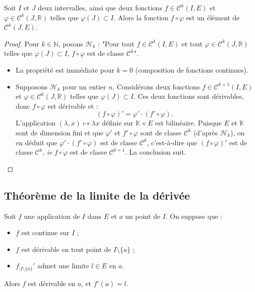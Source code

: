 \documentclass[french]{article}
\newcommand{\N}{\mathbb{N}}
\newcommand{\R}{\mathbb{R}}
\newcommand{\K}{\mathbb{K}}
\theoremstyle{plain}
\theoremstyle{definition}
\theoremstyle{remark}
\begin{document}
\begin{prop}%
	Soit $I$ et $J$ deux intervalles, ainsi que deux fonctions $f\in\mathcal{C}^k(I,E)$ et $\varphi\in\mathcal{C}^k(J,\R)$ telles que $\varphi(J)\subset I$. Alors la fonction $f\circ\varphi$ est un élément de $\mathcal{C}^k(J,E)$.
\end{prop}
\begin{proof}
	Pour $k\in\N$, posons $\mathcal{H}_k$ : "Pour tout $f\in\mathcal{C}^k(I,E)$ et tout $\varphi\in\mathcal{C}^k(J,\R)$ telles que $\varphi(J)\subset I$, $f\circ\varphi$ est de classe $\mathcal{C}^k$".
	\begin{itemize}
		\item La propriété est immédiate pour $k=0$ (composition de fonctions continues).
		\item Supposons $\mathcal{H}_k$ pour un entier $n$. Considérons deux fonctions $f\in\mathcal{C}^{k+1}(I,E)$ et $\varphi\in\mathcal{C}^k(J,\R)$ telles que $\varphi(J)\subset I$. Ces deux fonctions sont dérivables, donc $f\circ\varphi$ est dérivable et :
		$$(f\circ\varphi)'=\varphi'\cdot(f'\circ\varphi).$$
		L'application $(\lambda,x)\mapsto\lambda x$ définie sur $\K\times E$ est bilinéaire. Puisque $E$ et $\K$ sont de dimension fini et que $\varphi'$ et $f'\circ\varphi$ sont de classe $\mathcal{C}^k$ (d'après $\mathcal{H}_k$), on en déduit que $\varphi'\cdot(f'\circ\varphi)$ est de classe $\mathcal{C}^k$, c'est-à-dire que $(f\circ\varphi)'$ est de classe $\mathcal{C}^k$, \textit{ie} $f\circ\varphi$ est de classe $\mathcal{C}^{k+1}$. La conclusion suit.
	\end{itemize}
\end{proof}

\subsection{Théorème de la limite de la dérivée}


\begin{prop}%
	Soit $f$ une application de $I$ dans $E$ et $a$ un point de $I$. On suppose que :
	\begin{itemize}
		\item $f$ est continue sur $I$ ;
		\item $f$ est dérivable en tout point de $I\setminus\{a\}$ ;
		\item $f_{\mid I\setminus\{a\}}'$ admet une limite $l\in E$ en $a$.
	\end{itemize}
	Alors $f$ est dérivable en $a$, et $f'(a)=l$.
\end{prop} %
\end{document}
